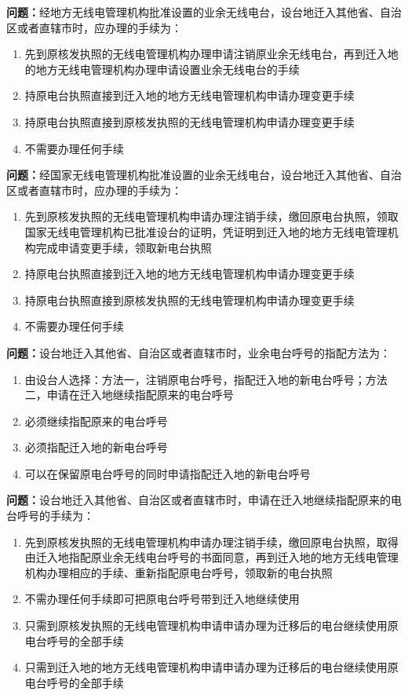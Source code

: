 \bigskip


\noindent\textbf{问题：}经地方无线电管理机构批准设置的业余无线电台，设台地迁入其他省、自治区或者直辖市时，应办理的手续为：
\begin{enumerate}[label=\Alph*), leftmargin=3em]
\item 先到原核发执照的无线电管理机构办理申请注销原业余无线电台，再到迁入地的地方无线电管理机构办理申请设置业余无线电台的手续
\item 持原电台执照直接到迁入地的地方无线电管理机构申请办理变更手续
\item 持原电台执照直接到原核发执照的无线电管理机构申请办理变更手续
\item 不需要办理任何手续
\end{enumerate}

\bigskip


\noindent\textbf{问题：}经国家无线电管理机构批准设置的业余无线电台，设台地迁入其他省、自治区或者直辖市时，应办理的手续为：
\begin{enumerate}[label=\Alph*), leftmargin=3em]
\item 先到原核发执照的无线电管理机构申请办理注销手续，缴回原电台执照，领取国家无线电管理机构已批准设台的证明，凭证明到迁入地的地方无线电管理机构完成申请变更手续，领取新电台执照
\item 持原电台执照直接到迁入地的地方无线电管理机构申请办理变更手续
\item 持原电台执照直接到原核发执照的无线电管理机构申请办理变更手续
\item 不需要办理任何手续
\end{enumerate}

\bigskip


\noindent\textbf{问题：}设台地迁入其他省、自治区或者直辖市时，业余电台呼号的指配方法为：
\begin{enumerate}[label=\Alph*), leftmargin=3em]
\item 由设台人选择：方法一，注销原电台呼号，指配迁入地的新电台呼号；方法二，申请在迁入地继续指配原来的电台呼号
\item 必须继续指配原来的电台呼号
\item 必须指配迁入地的新电台呼号
\item 可以在保留原电台呼号的同时申请指配迁入地的新电台呼号
\end{enumerate}

\bigskip


\noindent\textbf{问题：}设台地迁入其他省、自治区或者直辖市时，申请在迁入地继续指配原来的电台呼号的手续为：
\begin{enumerate}[label=\Alph*), leftmargin=3em]
\item 先到原核发执照的无线电管理机构申请办理注销手续，缴回原电台执照，取得由迁入地指配原业余无线电台呼号的书面同意，再到迁入地的地方无线电管理机构办理相应的手续、重新指配原电台呼号，领取新的电台执照
\item 不需办理任何手续即可把原电台呼号带到迁入地继续使用
\item 只需到原核发执照的无线电管理机构申请申请办理为迁移后的电台继续使用原电台呼号的全部手续
\item 只需到迁入地的地方无线电管理机构申请申请办理为迁移后的电台继续使用原电台呼号的全部手续
\end{enumerate}

